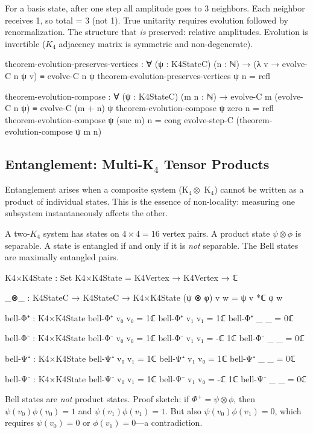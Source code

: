 \documentclass[11pt,a4paper]{book}
\begin{document}
For a basis state, after one step all amplitude goes to 3 neighbors. Each neighbor receives 1, so total = 3 (not 1). True unitarity requires evolution followed by renormalization. The structure that \emph{is} preserved: relative amplitudes. Evolution is invertible ($K_4$ adjacency matrix is symmetric and non-degenerate).

\begin{code}
theorem-evolution-preserves-vertices : ∀ (ψ : K4StateC) (n : ℕ) →
  (λ v → evolve-C n ψ v) ≡ evolve-C n ψ
theorem-evolution-preserves-vertices ψ n = refl

theorem-evolution-compose : ∀ (ψ : K4StateC) (m n : ℕ) →
  evolve-C m (evolve-C n ψ) ≡ evolve-C (m + n) ψ
theorem-evolution-compose ψ zero    n = refl
theorem-evolution-compose ψ (suc m) n = cong evolve-step-C (theorem-evolution-compose ψ m n)
\end{code}

\subsection{Entanglement: Multi-K$_4$ Tensor Products}

Entanglement arises when a composite system (K$_4 \otimes$ K$_4$) cannot 
be written as a product of individual states. This is the essence of 
non-locality: measuring one subsystem instantaneously affects the other.

A two-$K_4$ system has states on $4 \times 4 = 16$ vertex pairs. A product state $\psi \otimes \phi$ is separable. A state is entangled if and only if it is \emph{not} separable. The Bell states are maximally entangled pairs.

\begin{code}
K4×K4State : Set
K4×K4State = K4Vertex → K4Vertex → ℂ

_⊗_ : K4StateC → K4StateC → K4×K4State
(ψ ⊗ φ) v w = ψ v *ℂ φ w

bell-Φ⁺ : K4×K4State
bell-Φ⁺ v₀ v₀ = 1ℂ
bell-Φ⁺ v₁ v₁ = 1ℂ
bell-Φ⁺ _  _  = 0ℂ

bell-Φ⁻ : K4×K4State
bell-Φ⁻ v₀ v₀ = 1ℂ
bell-Φ⁻ v₁ v₁ = -ℂ 1ℂ
bell-Φ⁻ _  _  = 0ℂ

bell-Ψ⁺ : K4×K4State
bell-Ψ⁺ v₀ v₁ = 1ℂ
bell-Ψ⁺ v₁ v₀ = 1ℂ
bell-Ψ⁺ _  _  = 0ℂ

bell-Ψ⁻ : K4×K4State
bell-Ψ⁻ v₀ v₁ = 1ℂ
bell-Ψ⁻ v₁ v₀ = -ℂ 1ℂ
bell-Ψ⁻ _  _  = 0ℂ
\end{code}

Bell states are \emph{not} product states. Proof sketch: if $\Phi^+ = \psi \otimes \phi$, then $\psi(v_0)\phi(v_0) = 1$ and $\psi(v_1)\phi(v_1) = 1$. But also $\psi(v_0)\phi(v_1) = 0$, which requires $\psi(v_0) = 0$ or $\phi(v_1) = 0$---a contradiction.
\end{document}
